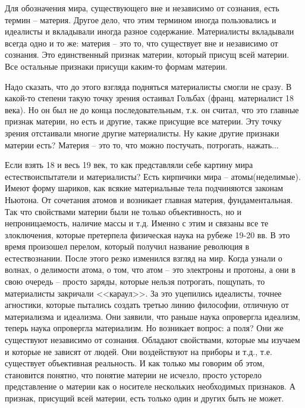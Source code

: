 Для обозначения мира, существующего вне и независимо от сознания, есть термин – материя. Другое дело, что этим термином иногда пользовались и идеалисты и вкладывали иногда разное содержание. Материалисты вкладывали всегда одно и то же: материя – это то, что существует вне и независимо от сознания. Это единственный признак материи, который присущ всей материи. Все остальные признаки присущи каким-то формам материи.

    Надо сказать, что до этого взгляда подняться материалисты смогли не сразу. В какой-то степени такую точку зрения остаивал Гольбах (франц. материалист 18 века). Но он был не до конца последовательным, т.к. он считал, что это главные признак материи, но есть и другие, также присущие все материи. Эту точку зрения отстаивали многие другие материалисты. Ну какие другие признаки материи есть? Материя – это то, что можно постучать, потрогать, нажать...

Если взять 18 и весь 19 век, то как представляли себе картину мира естествоиспытатели и материалисты? Есть кирпичики мира – атомы(неделимые). Имеют форму шариков, как всякие материальные тела подчиняются законам Ньютона. От сочетания атомов и возникает главная материя, фундаментальная. Так что свойствами материи были не только объективность, но и непроницаемость, наличие массы и т.д. Именно с этим и связаны все те злоключения, которые претерпела физическая наука на рубеже 19-20 вв. В это время произошел перелом, который получил название революция в естествознании. После этого резко изменился взгляд на мир. Когда узнали о волнах, о делимости атома, о том, что атом – это электроны и протоны, а они в свою очередь – просто заряды, которые нельзя потрогать, пощупать, то материалисты закричали <<караул>>. За это уцепились идеалисты, точнее агностики, которые пытались создать третью линию философии, отличную от материализма и идеализма. Они заявили, что раньше наука опровергла идеализм, теперь наука опровергла материализм. Но возникает вопрос: а поля? Они же существуют независимо от сознания. Обладают свойствами, которые мы изучаем и которые не зависят от людей. Они воздействуют на приборы и т.д., т.е. существует объективная реальность. И как только мы говорим об этом, становится понятно, что понятие материи не исчезло, просто усторело представление о материи как о носителе нескольких необходимых признаков. А признак, присущий всей материи, есть только один и других быть не может.

